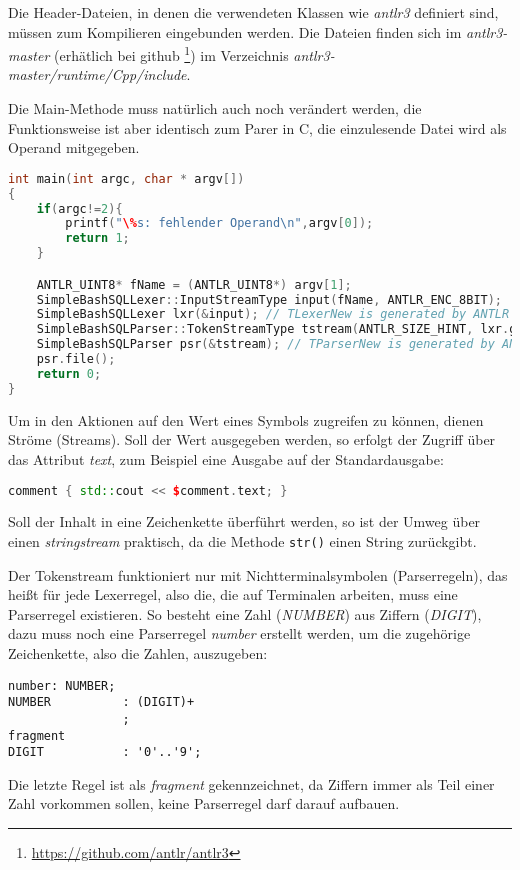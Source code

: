 Die Header-Dateien, in denen die verwendeten Klassen wie \textit{antlr3} definiert sind, müssen zum Kompilieren eingebunden werden. Die Dateien finden sich im \textit{antlr3-master} (erhätlich bei github
\footnote{\url{https://github.com/antlr/antlr3}})
im Verzeichnis \textit{antlr3-master/runtime/Cpp/include}.

Die Main-Methode muss natürlich auch noch verändert werden, die Funktionsweise ist aber identisch zum Parer in C, die einzulesende Datei wird als Operand mitgegeben.

\begin{lstlisting}[language=C++]
int main(int argc, char * argv[])
{
	if(argc!=2){
		printf("\%s: fehlender Operand\n",argv[0]);
		return 1;
	}

	ANTLR_UINT8* fName = (ANTLR_UINT8*) argv[1];
	SimpleBashSQLLexer::InputStreamType input(fName, ANTLR_ENC_8BIT);
	SimpleBashSQLLexer lxr(&input); // TLexerNew is generated by ANTLR
	SimpleBashSQLParser::TokenStreamType tstream(ANTLR_SIZE_HINT, lxr.get_tokSource() );
	SimpleBashSQLParser psr(&tstream); // TParserNew is generated by ANTLR3
	psr.file();
	return 0;
}
\end{lstlisting}

Um in den Aktionen auf den Wert eines Symbols zugreifen zu können, dienen Ströme (Streams). Soll der Wert ausgegeben werden, so erfolgt der Zugriff über das Attribut \textit{text}, zum Beispiel eine Ausgabe auf der Standardausgabe:
\begin{lstlisting}[language=C++]
comment { std::cout << $comment.text; }
\end{lstlisting}
Soll der Inhalt in eine Zeichenkette überführt werden, so ist der Umweg über einen \textit{stringstream} praktisch, da die Methode \lstinline{str()} einen String zurückgibt. 

Der Tokenstream funktioniert nur mit Nichtterminalsymbolen (Parserregeln), das heißt für jede Lexerregel, also die, die auf Terminalen arbeiten, muss eine Parserregel existieren. So besteht eine Zahl (\textit{NUMBER}) aus Ziffern (\textit{DIGIT}), dazu muss noch eine Parserregel \textit{number} erstellt werden, um die zugehörige Zeichenkette, also die Zahlen, auszugeben:
\begin{lstlisting}
number: NUMBER;
NUMBER          : (DIGIT)+
                ;
fragment
DIGIT           : '0'..'9';
\end{lstlisting}
Die letzte Regel ist als \textit{fragment} gekennzeichnet, da Ziffern immer als Teil einer Zahl vorkommen sollen, keine Parserregel darf darauf aufbauen.


